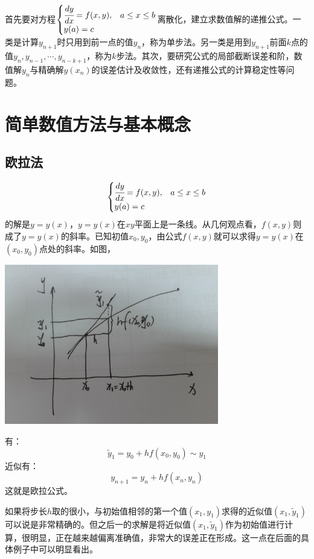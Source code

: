首先要对方程$\begin{cases}\cfrac{dy}{dx}=f(x,y),&a\le x\le b\\ y(a)=c &\end{cases}$离散化，建立求数值解的递推公式。一类是计算$y_{n+1}$时只用到前一点的值$y_n$，称为单步法。另一类是用到$y_{n+1}$前面$k$点的值$y_n,y_{n-1},\cdots,y_{n-k+1}$，称为$k$步法。其次，要研究公式的局部截断误差和阶，数值解$y_n$与精确解$y(x_n)$的误差估计及收敛性，还有递推公式的计算稳定性等问题。



\section{简单数值方法与基本概念}

\subsection{欧拉法}
$$\begin{cases}\cfrac{dy}{dx}=f(x,y),&a\le x\le b\\ y(a)=c &\end{cases}$$
的解是$y=y(x)$，$y=y(x)$在$xy$平面上是一条线。从几何观点看，$f(x,y)$则成了$y=y(x)$的斜率。已知初值$x_0,y_0$，由公式$f(x,y)$就可以求得$y=y(x)$在$(x_0,y_0)$点处的斜率。如图，


\includegraphics[width=0.7\textwidth]{pictures/2012-07-25.jpg}


有：
$$\tilde{y}_1=y_0+hf(x_0,y_0)\sim y_1$$
近似有：
$$y_{n+1}= y_n+h f(x_n,y_n)$$
这就是欧拉公式。

如果将步长$h$取的很小，与初始值相邻的第一个值$(x_1,y_1)$求得的近似值$(x_1,\tilde{y}_1)$可以说是非常精确的。但之后一的求解是将近似值$(x_1,\tilde{y}_1)$作为初始值进行计算，很明显，正在越来越偏离准确值，非常大的误差正在形成。这一点在后面的具体例子中可以明显看出。



